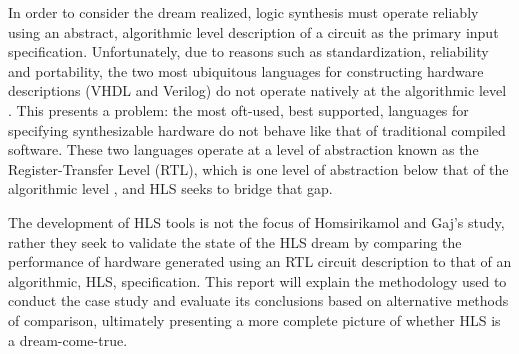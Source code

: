 \documentclass[11pt,journal,compsoc, onecolumn]{IEEEtran}
\begin{document}
In order to consider the dream realized, logic synthesis must operate reliably using an abstract, algorithmic level description of a circuit as the primary input specification\cite{mcfarland}. Unfortunately, due to reasons such as standardization\cite{ieee}, reliability\cite{tosun} and portability\cite{churtl}, the two most ubiquitous languages for constructing hardware descriptions (VHDL and Verilog) do not operate natively at the algorithmic level \cite{Harris+Harris}. This presents a problem: the most oft-used, best supported, languages for specifying synthesizable hardware do not behave like that of traditional compiled software. These two languages operate at a level of abstraction known as the Register-Transfer Level (RTL), which is one level of abstraction below that of the algorithmic level \cite{vahid}, and HLS seeks to bridge that gap.

The development of HLS tools is not the focus of Homsirikamol and Gaj's study, rather they seek to validate the state of the HLS dream by comparing the performance of hardware generated using an RTL circuit description to that of an algorithmic, HLS, specification. This report will explain the methodology used to conduct the case study and evaluate its conclusions based on alternative methods of comparison, ultimately presenting a more complete picture of whether HLS is a dream-come-true.
\end{document}
